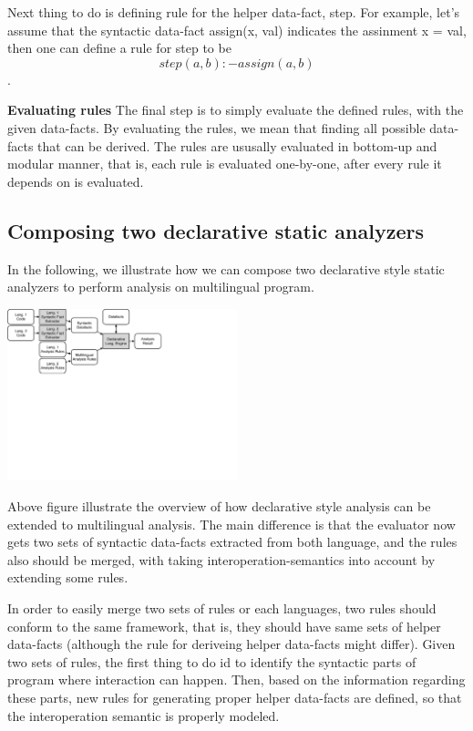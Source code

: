 Next thing to do is defining rule for the helper data-fact, step.  For example,
let's assume that the syntactic data-fact assign(x, val) indicates the assinment
x = val, then one can define a rule for step to be
\[step(a,b) :- assign(a, b)\].

\textbf{Evaluating rules}
The final step is to simply evaluate the defined rules, with the given
data-facts.  By evaluating the rules, we mean that finding all possible
data-facts that can be derived. The rules are ususally evaluated in bottom-up
and modular manner, that is, each rule is evaluated one-by-one, after every
rule it depends on is evaluated.

\subsection{Composing two declarative static analyzers}

In the following, we illustrate how we can compose two declarative style static analyzers
to perform analysis on multilingual program.

\includegraphics[width=0.5\textwidth]{img/overview2}

Above figure illustrate the overview of how declarative style analysis can be
extended to multilingual analysis. The main difference is that the evaluator
now gets two sets of syntactic data-facts extracted from both language, and the
rules also should be merged, with taking interoperation-semantics into account by
extending some rules.

In order to easily merge two sets of rules or each languages, two rules should
conform to the same framework, that is, they should have same sets of helper
data-facts (although the rule for deriveing helper data-facts might differ).
Given two sets of rules, the first thing to do id to identify the syntactic
parts of program where interaction can happen.  Then, based on the information
regarding these parts, new rules for generating proper helper data-facts are
defined, so that the interoperation semantic is properly modeled.

